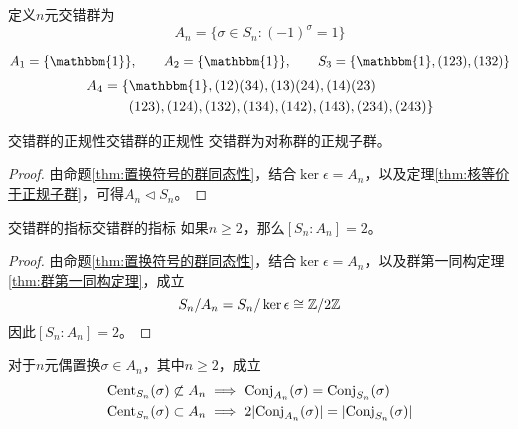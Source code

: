 \begin{definition}
	定义$n$元交错群为
	$$
	A_n=\{ \sigma\in S_n:(-1)^\sigma=1 \}
	$$
\end{definition}

\begin{example}
	$$
	A_1=\{\mathbbm{1}\},\qquad A_2=\{\mathbbm{1}\},\qquad S_3=\{ \mathbbm{1},(123),(132) \}
	$$
	\begin{align*}
		A_4 = \{ & \mathbbm{1},(12)(34),(13)(24),(14)(23)\\
		& (123),(124),(132),(134),(142),(143),(234),(243)\}
	\end{align*}
\end{example}

\begin{theorem}{交错群的正规性}{交错群的正规性}
	交错群为对称群的正规子群。
\end{theorem}

\begin{proof}
	由命题\ref{thm:置换符号的群同态性}，结合$\ker\epsilon=A_n$，以及定理\ref{thm:核等价于正规子群}，可得$A_n\lhd S_n$。
\end{proof}

\begin{theorem}{交错群的指标}{交错群的指标}
	如果$n\ge 2$，那么$[S_n:A_n]=2$。
\end{theorem}

\begin{proof}
	由命题\ref{thm:置换符号的群同态性}，结合$\ker\epsilon=A_n$，以及群第一同构定理\ref{thm:群第一同构定理}，成立
	$$
	S_n/A_n=S_n/\ker\epsilon\cong \mathbb{Z}/2\mathbb{Z}
	$$
	因此$[S_n:A_n]=2$。
\end{proof}

\begin{proposition}
	对于$n$元偶置换$\sigma\in A_n$，其中$n\ge 2$，成立
	\begin{align*}
		&\mathrm{Cent}_{S_n}(\sigma)\not\subset A_n\implies \mathrm{Conj}_{A_n}(\sigma)=\mathrm{Conj}_{S_n}(\sigma)\\
		&\mathrm{Cent}_{S_n}(\sigma)\subset A_n\implies 2|\mathrm{Conj}_{A_n}(\sigma)|=|\mathrm{Conj}_{S_n}(\sigma)|
	\end{align*}
\end{proposition}

